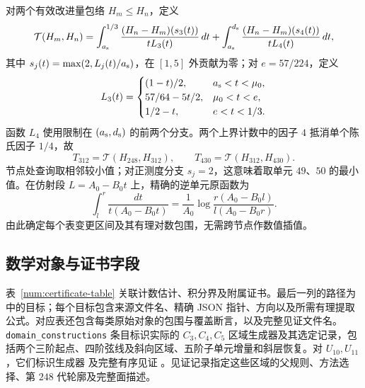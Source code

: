 对两个有效改进量包络 $H_m\le H_n$，定义
\begin{equation}
 \mathcal T(H_m,H_n)=
 \int_{a_{\rm s}}^{1/3}\frac{(H_n-H_m)(s_3(t))}{tL_3(t)}\,dt
 +\int_{a_{\rm s}}^{d_{\rm s}}\frac{(H_n-H_m)(s_4(t))}{tL_4(t)}\,dt,
 \label{num:table-change-integral}
\end{equation}
其中 $s_j(t)=\max(2,L_j(t)/{a_{\rm s}})$，在 $[1,5]$ 外贡献为零；对 $e=57/224$，定义
\[
 L_3(t)=\begin{cases}
 (1-t)/2,&{a_{\rm s}}<t<\mu_0,\\
 57/64-5t/2,&\mu_0<t<e,\\
 1/2-t,&e<t<1/3.
 \end{cases}
\]
函数 $L_4$ 使用限制在 $({a_{\rm s}},{d_{\rm s}})$ 的前两个分支。两个上界计数中的因子 $4$ 抵消单个陈氏因子 $1/4$，故
\begin{equation}
 T_{312}=\mathcal T(H_{248},H_{312}),\qquad
 T_{430}=\mathcal T(H_{312},H_{430}).
 \label{num:successive-table-gains}
\end{equation}
节点处查询取相邻较小值；对正测度分支 $s_j=2$，这意味着取单元 $49$、$50$ 的最小值。在仿射段 $L=A_0-B_0t$ 上，精确的逆单元原函数为
\[
 \int_l^r\frac{dt}{t(A_0-B_0t)}
 =\frac1{A_0}\log\frac{r(A_0-B_0l)}{l(A_0-B_0r)}.
\]
由此确定每个表变更区间及其有理对数包围，无需跨节点作数值插值。

\subsection{数学对象与证书字段}
\label{num:certificate-chain}
表~\ref{num:certificate-table} 关联计数估计、积分界及附属证书。最后一列的路径为  中的目标；每个目标包含来源文件名、精确 JSON 指针、方向以及所需有理提取公式。对应表还包含每类原始对象的包围与覆盖断言，以及完整见证文件名。\texttt{domain\_constructions} 条目标识实际的 $C_3,C_4,C_5$ 区域生成器及其选定记录，包括两个三阶起点、四阶弦线及斜向区域、五阶子单元增量和斜层恢复。对 $U_{10},U_{11}$，它们标识生成器  及完整有序见证 。见证记录指定这些区域的父规则、方法选择、第 $248$ 代轮廓及完整面描述。

